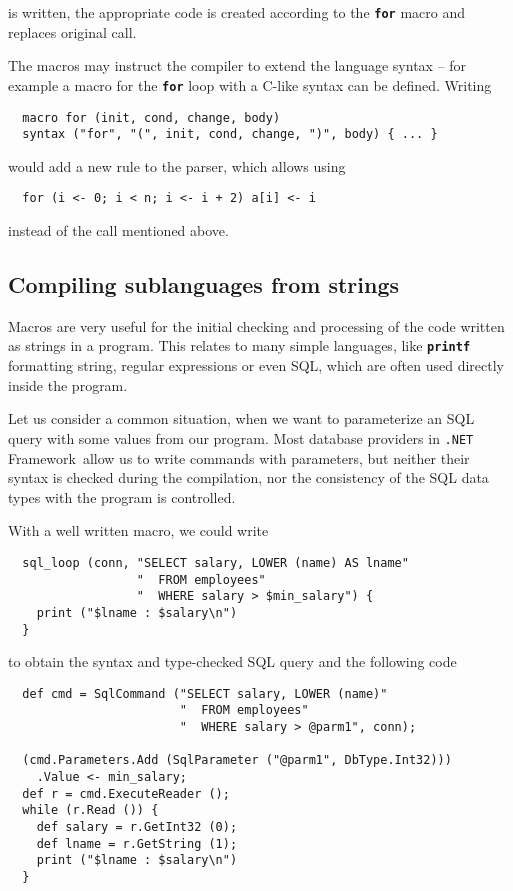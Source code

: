 \documentclass{llncs}
\newcommand{\netf}[0]{{\tt .NET} Framework}
\newcommand{\kw}[1]{{\tt \bf #1}}
\begin{document}
\noindent
is written, the appropriate code is created according to the \kw{for} macro and 
replaces original call.

The macros may instruct the compiler to extend the language syntax -- for example 
a macro for the \kw{for} loop with a C-like syntax can be defined. Writing

\begin{verbatim}
  macro for (init, cond, change, body) 
  syntax ("for", "(", init, cond, change, ")", body) { ... }
\end{verbatim}

\noindent
would add a new rule to the parser, which allows using

\begin{verbatim}
  for (i <- 0; i < n; i <- i + 2) a[i] <- i
\end{verbatim}

\noindent
instead of the call mentioned above.

\subsection{Compiling sublanguages from strings}
Macros are very useful for the initial checking and processing of the code
written as strings in a program. This relates to many simple languages,
like \kw{printf} formatting string, regular expressions or even SQL, which are 
often used directly inside the program. 

Let us consider a common situation, when we want to parameterize an SQL query
with some values from our program. Most database providers in 
\netf\ allow us to write commands with parameters, but neither their syntax 
is checked during the compilation, nor the consistency of the SQL data types 
with the program is controlled.

With a well written macro, we could write
\begin{verbatim}
  sql_loop (conn, "SELECT salary, LOWER (name) AS lname"
                  "  FROM employees"
                  "  WHERE salary > $min_salary") {
    print ("$lname : $salary\n")
  }
\end{verbatim} %

to obtain the syntax and type-checked SQL query and the following code
\begin{verbatim}
  def cmd = SqlCommand ("SELECT salary, LOWER (name)"
                        "  FROM employees"
                        "  WHERE salary > @parm1", conn);

  (cmd.Parameters.Add (SqlParameter ("@parm1", DbType.Int32)))
    .Value <- min_salary;
  def r = cmd.ExecuteReader ();
  while (r.Read ()) {
    def salary = r.GetInt32 (0);
    def lname = r.GetString (1);
    print ("$lname : $salary\n")
  }
\end{verbatim}
\end{document}
